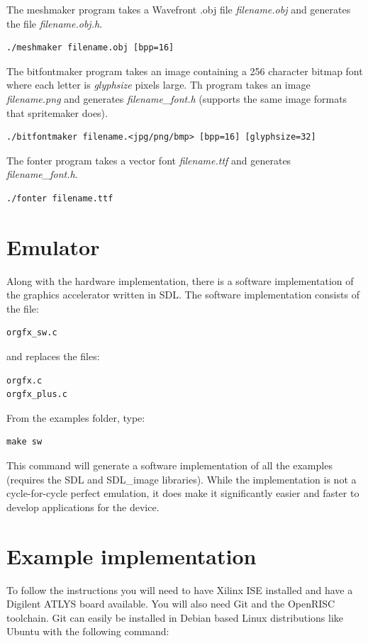 \documentclass[10pt,a4paper]{article}
\begin{document}
The meshmaker program takes a Wavefront .obj file \textit{filename.obj} and generates the file \textit{filename.obj.h}.
\begin{lstlisting}
./meshmaker filename.obj [bpp=16]
\end{lstlisting}

The bitfontmaker program takes an image containing a 256 character bitmap font where each letter is \textit{glyphsize} pixels large. Th program takes an image \textit{filename.png} and generates \textit{filename\_font.h} (supports the same image formats that spritemaker does).
\begin{lstlisting}
./bitfontmaker filename.<jpg/png/bmp> [bpp=16] [glyphsize=32]
\end{lstlisting}

The fonter program takes a vector font \textit{filename.ttf} and generates \textit{filename\_font.h}.
\begin{lstlisting}
./fonter filename.ttf
\end{lstlisting}

\section{Emulator}
Along with the hardware implementation, there is a software implementation of the graphics accelerator written in SDL. The software implementation consists of the file:

\begin{lstlisting}
orgfx_sw.c
\end{lstlisting}

and replaces the files:

\begin{lstlisting}
orgfx.c
orgfx_plus.c
\end{lstlisting}

From the examples folder, type:
\begin{lstlisting}
make sw
\end{lstlisting}

This command will generate a software implementation of all the examples (requires the SDL and SDL\_image libraries). While the implementation is not a cycle-for-cycle perfect emulation, it does make it significantly easier and faster to develop applications for the device.

\section{Example implementation}
To follow the instructions you will need to have Xilinx ISE installed and have a Digilent ATLYS board available. You will also need Git and the OpenRISC toolchain. Git can easily be installed in Debian based Linux distributions like Ubuntu with the following command:
\end{document}

